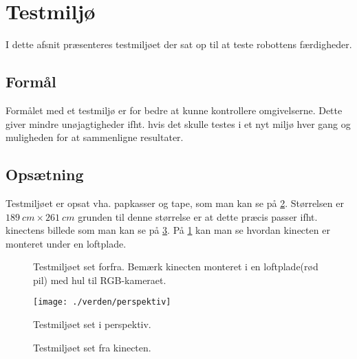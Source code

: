 \section{Testmiljø}
I dette afsnit præsenteres testmiljøet der sat op til at teste robottens færdigheder.

\subsection{Formål}
Formålet med et testmiljø er for bedre at kunne kontrollere omgivelserne.
Dette giver mindre unøjagtigheder ifht. hvis det skulle testes i et nyt miljø hver gang og muligheden for at sammenligne resultater.

\subsection{Opsætning}\label{testmiljo:opsaetning}
Testmiljøet er opsat vha. papkasser og tape, som man kan se på \cref{testmiljo:perspektiv}.
Størrelsen er $189 \ cm \times 261 \ cm$ grunden til denne størrelse er at dette præcis passer ifht. kinectens billede som man kan se på \cref{testmiljo:oppefra}.
På \cref{testmiljo:forfra} kan man se hvordan kinecten er monteret under en loftplade.

\begin{figure}
\caption{Testmiljøet set forfra. Bemærk kinecten monteret i en loftplade(rød pil) med hul til RGB-kameraet.}
\label{testmiljo:forfra}
\end{figure}

\begin{figure}
\texttt{[image: ./verden/perspektiv]}
\caption{Testmiljøet set i perspektiv.}
\label{testmiljo:perspektiv}
\end{figure}

\begin{figure}
\caption{Testmiljøet set fra kinecten.}
\label{testmiljo:oppefra}
\end{figure}